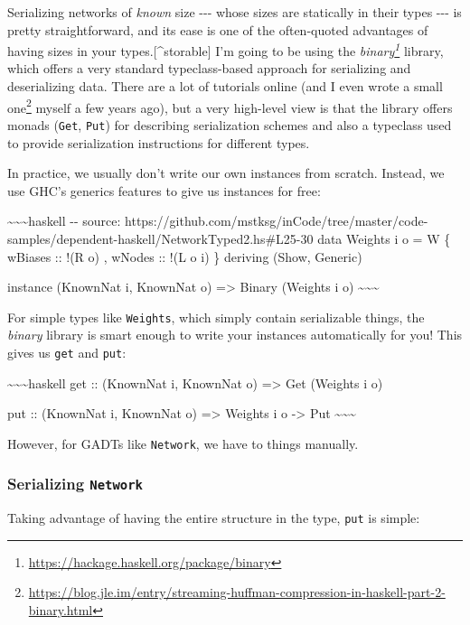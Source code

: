 \documentclass[]{article}
\renewcommand{\href}[2]{#2\footnote{\url{#1}}}
\begin{document}
Serializing networks of \emph{known} size -\/-\/- whose sizes are statically in
their types -\/-\/- is pretty straightforward, and its ease is one of the
often-quoted advantages of having sizes in your types.{[}\^{}storable{]} I'm
going to be using the
\emph{\href{https://hackage.haskell.org/package/binary}{binary}} library, which
offers a very standard typeclass-based approach for serializing and
deserializing data. There are a lot of tutorials online (and I even
\href{https://blog.jle.im/entry/streaming-huffman-compression-in-haskell-part-2-binary.html}{wrote
a small one} myself a few years ago), but a very high-level view is that the
library offers monads (\texttt{Get}, \texttt{Put}) for describing serialization
schemes and also a typeclass used to provide serialization instructions for
different types.

In practice, we usually don't write our own instances from scratch. Instead, we
use GHC's generics features to give us instances for free:

\textasciitilde{}\textasciitilde{}\textasciitilde{}haskell -\/- source:
https://github.com/mstksg/inCode/tree/master/code-samples/dependent-haskell/NetworkTyped2.hs\#L25-30
data Weights i o = W \{ wBiases :: !(R o) , wNodes :: !(L o i) \} deriving
(Show, Generic)

instance (KnownNat i, KnownNat o) =\textgreater{} Binary (Weights i o)
\textasciitilde{}\textasciitilde{}\textasciitilde{}

For simple types like \texttt{Weights}, which simply contain serializable
things, the \emph{binary} library is smart enough to write your instances
automatically for you! This gives us \texttt{get} and \texttt{put}:

\textasciitilde{}\textasciitilde{}\textasciitilde{}haskell get :: (KnownNat i,
KnownNat o) =\textgreater{} Get (Weights i o)

put :: (KnownNat i, KnownNat o) =\textgreater{} Weights i o -\textgreater{} Put
\textasciitilde{}\textasciitilde{}\textasciitilde{}

However, for GADTs like \texttt{Network}, we have to things manually.

\subsubsection{\texorpdfstring{Serializing
\texttt{Network}}{Serializing Network}}

Taking advantage of having the entire structure in the type, \texttt{put} is
simple:
\end{document}
